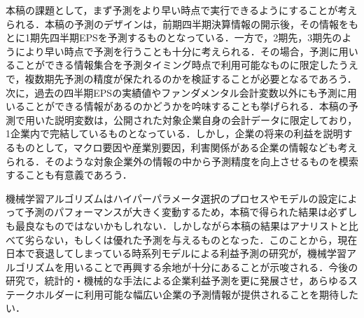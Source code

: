 \documentclass[a4paper，12pt]{jsarticle}
\begin{document}
本稿の課題として，まず予測をより早い時点で実行できるようにすることが考えられる．本稿の予測のデザインは，前期四半期決算情報の開示後，その情報をもとに1期先四半期EPSを予測するものとなっている．一方で，2期先，3期先のようにより早い時点で予測を行うことも十分に考えられる．その場合，予測に用いることができる情報集合を予測タイミング時点で利用可能なものに限定したうえで，複数期先予測の精度が保たれるのかを検証することが必要となるであろう．次に，過去の四半期EPSの実績値やファンダメンタル会計変数以外にも予測に用いることができる情報があるのかどうかを吟味することも挙げられる．本稿の予測で用いた説明変数は，公開された対象企業自身の会計データに限定しており，1企業内で完結しているものとなっている．しかし，企業の将来の利益を説明するものとして，マクロ要因や産業別要因，利害関係がある企業の情報なども考えられる．そのような対象企業外の情報の中から予測精度を向上させるものを模索することも有意義であろう．

機械学習アルゴリズムはハイパーパラメータ選択のプロセスやモデルの設定によって予測のパフォーマンスが大きく変動するため，本稿で得られた結果は必ずしも最良なものではないかもしれない．しかしながら本稿の結果はアナリストと比べて劣らない，もしくは優れた予測を与えるものとなった．このことから，現在日本で衰退してしまっている時系列モデルによる利益予測の研究が，機械学習アルゴリズムを用いることで再興する余地が十分にあることが示唆される．今後の研究で，統計的・機械的な手法による企業利益予測を更に発展させ，あらゆるステークホルダーに利用可能な幅広い企業の予測情報が提供されることを期待したい．






% 

% 


\appendix

\end{document}
